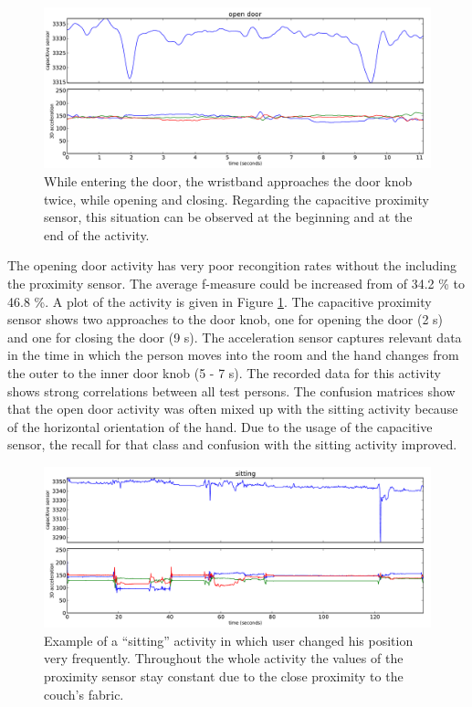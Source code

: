 \documentclass[runningheads,a4paper]{llncs}
\begin{document}
\begin{figure}[htbp]
	\centering
		\includegraphics[width=1.00\textwidth]{../Auswertung/images/tobias_1.pdf}
	\caption{While entering the door, the wristband approaches the door knob twice, while opening and closing. Regarding the capacitive proximity sensor, this situation can be observed at the beginning and at the end of the activity.}
	\label{fig:tobias_1}
\end{figure}

The opening door activity has very poor recongition rates without the including the proximity sensor. The average f-measure could be increased from of 34.2 \% to 46.8 \%. A plot of the activity is given in Figure \ref{fig:tobias_1}. The capacitive proximity sensor shows two approaches to the door knob, one for opening the door (2 s) and one for closing the door (9 s). The acceleration sensor captures relevant data in the time in which the person moves into the room and the hand changes from the outer to the inner door knob (5 - 7 s). The recorded data for this activity shows strong correlations between all test persons. The confusion matrices show that the open door activity was often mixed up with the sitting activity because of the horizontal orientation of the hand. Due to the usage of the capacitive sensor, the recall for that class and confusion with the sitting activity improved. 

\begin{figure}[htbp]
	\centering
		\includegraphics[width=1.00\textwidth]{../Auswertung/images/eugen_2.pdf}
	\caption{Example of a ``sitting'' activity in which user changed his position very frequently. Throughout the whole activity the values of the proximity sensor stay constant due to the close proximity to the couch's fabric.}
	\label{fig:eugen_2}
\end{figure}
\end{document}
